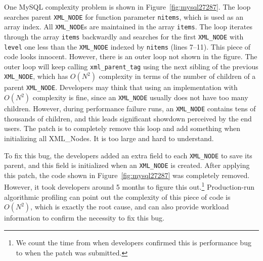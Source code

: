 


One MySQL complexity problem is shown in Figure~\ref{fig:mysql27287}.
The loop searches parent \texttt{XML\_NODE} for function parameter \texttt{nitems},
which is used as an array index. 
All \texttt{XML\_NODE}s are maintained in the array \texttt{items}.
The loop iterates through the array \texttt{items}
backwardly and searches for the first \texttt{XML\_NODE} 
with \texttt{level} one less than the \texttt{XML\_NODE} 
indexed by \texttt{nitems} (lines 7--11).
This piece of code looks innocent.
However, there is an outer loop not shown in the figure.
The outer loop will keep calling \texttt{xml\_parent\_tag} using
the next sibling of the previous \texttt{XML\_NODE},
which has $O(N^2)$ complexity in terms of the number of children of a parent \texttt{XML\_NODE}.
Developers may think that using an implementation with $O(N^2)$ complexity is fine,
since an \texttt{XML\_NODE} usually does not have too many children.
However, during performance failure runs,
an \texttt{XML\_NODE} contains tens of thousands of children,
and this leads significant showdown perceived by the end users.
The patch is to completely remove this loop and add something when initializing all XML\_Nodes. 
It is too large and hard to understand.


To fix this bug, the developers added an extra field to each \texttt{XML\_NODE} to save its parent,
and this field is initialized when an \texttt{XML\_NODE} is created.
After applying this patch, the code shown in Figure~\ref{fig:mysql27287} was completely removed.
However, it took developers around 5 months to figure this
out.\footnote{We count the time from when developers confirmed this is performance bug
to when the patch was submitted.}
Production-run algorithmic profiling 
can point out the complexity of this piece of code is $O(N^2)$, 
which is exactly the root cause, 
and can also provide workload information 
to confirm the necessity to fix this bug.


